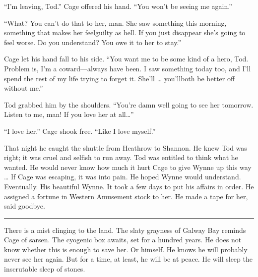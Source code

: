 ``I'm leaving, Tod.'' Cage offered his hand. ``You won't be seeing me again.''

``What? You can't do that to her, man. She saw something this morning, something that makes her feelguilty as hell. If you just disappear she's going to feel worse. Do you understand? You owe it to her to stay.''

Cage let his hand fall to his side. ``You want me to be some kind of a hero, Tod. Problem is, I'm a coward---always have been. I saw something today too, and I'll spend the rest of my life trying to forget it. She'll … you'llboth be better off without me.''

Tod grabbed him by the shoulders. ``You're damn well going to see her tomorrow. Listen to me, man! If you love her at all…''

``I love her.'' Cage shook free. ``Like I love myself.''

That night he caught the shuttle from Heathrow to Shannon. He knew Tod was right; it was cruel and selfish to run away. Tod was entitled to think what he wanted. He would never know how much it hurt Cage to give Wynne up this way … If Cage was escaping, it was into pain. He hoped Wynne would understand. Eventually. His beautiful Wynne. It took a few days to put his affairs in order. He assigned a fortune in Western Amusement stock to her. He made a tape for her, said goodbye.

\fancybreak{* * *}

There is a mist clinging to the land. The slaty grayness of Galway Bay reminds Cage of sarsen. The cyogenic box awaits, set for a hundred years. He does not know whether this is enough to save her. Or himself. He knows he will probably never see her again. But for a time, at least, he will be at peace. He will sleep the inscrutable sleep of stones.